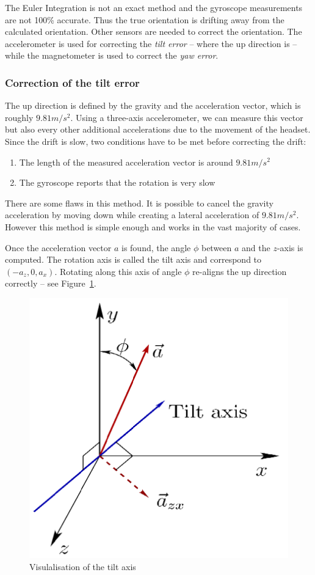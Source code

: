 \documentclass[12pt]{article}
\begin{document}
The Euler Integration is not an exact method and the gyroscope measurements are not 100\% accurate. Thus the true orientation is drifting away from the calculated orientation. Other sensors are needed to correct the orientation. The accelerometer is used for correcting the \textit{tilt error} -- where the up direction is -- while the magnetometer is used to correct the \textit{yaw error}.

\subsubsection{Correction of the tilt error}
The up direction is defined by the gravity and the acceleration vector, which is roughly $9.81m/s^2$. Using a three-axis accelerometer, we can measure this vector but also every other additional accelerations due to the movement of the headset. Since the drift is slow, two conditions have to be met before correcting the drift:
\begin{enumerate}
\item The length of the measured acceleration vector is around $9.81m/s^2$
\item The gyroscope reports that the rotation is very slow
\end{enumerate}
There are some flaws in this method. It is possible to cancel the gravity acceleration by moving down while creating a lateral acceleration of $9.81m/s^2$. However this method is simple enough and works in the vast majority of cases.

Once the acceleration vector $a$ is found, the angle $\phi$ between $a$ and the $z$-axis is computed. The rotation axis is called the tilt axis and correspond to $(-a_z, 0, a_x)$. Rotating along this axis of angle $\phi$ re-aligns the up direction correctly -- see Figure~\ref{fig:tilt}.

\begin{figure}[h]
  \centering
  \includegraphics[scale=0.2]{tilt.png}
  \caption{\label{fig:tilt} Visulalisation of the tilt axis}
\end{figure}
\end{document}
